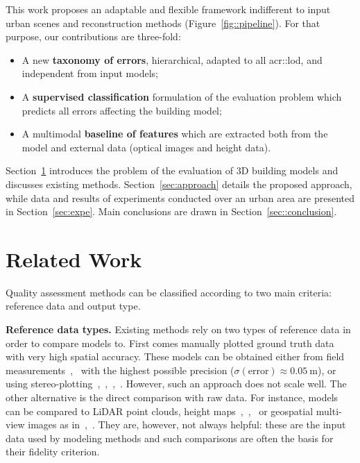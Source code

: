 \documentclass[runningheads]{llncs}
\begin{document}
     This work proposes an adaptable and flexible framework indifferent to input urban scenes and reconstruction methods (Figure~\ref{fig::pipeline}). For that purpose, our contributions are three-fold:
    \begin{itemize}
        \item A new \textbf{taxonomy of errors}, hierarchical, adapted to all \acrshort{acr::lod}, and independent from input models;
        \item A \textbf{supervised classification} formulation of the evaluation problem which predicts all errors affecting the building model;
        \item A multimodal \textbf{baseline of features} which are extracted both from the model and external data (optical images and height data).
    \end{itemize}

Section~\ref{sec:related} introduces the problem of the evaluation of 3D building models and discusses existing methods. Section~\ref{sec:approach} details the proposed approach, while data and results of experiments conducted over an urban area are presented in Section~\ref{sec:expe}. Main conclusions are drawn in Section~\ref{sec::conclusion}.

\section{Related Work}
\label{sec:related}
Quality assessment methods can be classified according to two main criteria: reference data and output type.

\noindent
\textbf{Reference data types.}
Existing methods rely on two types of reference data in order to compare models to. First comes manually plotted ground truth data with very high spatial accuracy. These models can be obtained either from field measurements~\cite{dick2004modelling},~\cite{Kaartinen2005} with the highest possible precision ($\sigma(\text{error}) \approx \SI{0.05}{\meter}$), or using stereo-plotting~\cite{jaynes2003recognition},~\cite{Kaartinen2005},~\cite{zebedin2008fusion},~\cite{Zeng2014}. However, such an approach does not scale well. The other alternative is the direct comparison with raw data. For instance, models can be compared to LiDAR point clouds, height maps~\cite{Akca2010},~\cite{lafarge2012creating},~\cite{li2016boxfitting} or geospatial multi-view images as in~\cite{boudet2006supervised},~\cite{Michelin2013}. They are, however, not always helpful: these are the input data used by modeling methods and such comparisons are often the basis for their fidelity criterion.
\end{document}
